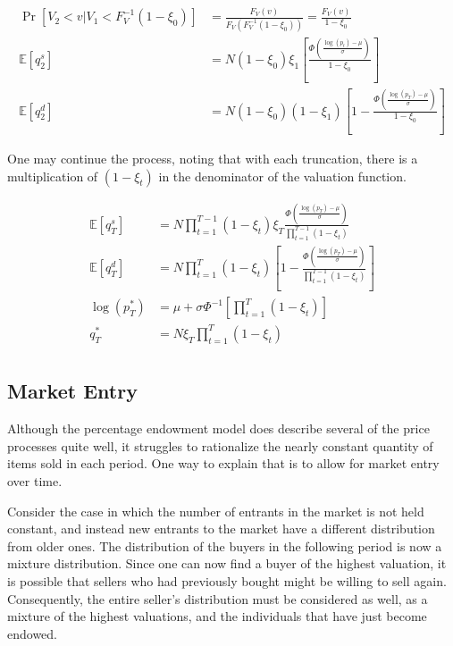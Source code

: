 \documentclass[12pt, letterpaper]{paper}
\begin{document}
\begin{align*}
\Pr \left [ V_2 < v | V_1 < F_V^{-1}( 1 - \xi_0 )^{} \right ] &=
\frac { F_V ( v ) }{  F_V ( F_V^{-1} ( 1 - \xi_0 ) ) } = \frac{ F_V (v)
}{1 - \xi_0}\\
\mathbb{E} \left [ q_2^s \right ] &= N ( 1-\xi_0 )\xi_1 \left [ \frac{\Phi \left ( \frac{ \log ( p_t ) - \mu }{\sigma} \right )}{ 1 - \xi_0 } \right ]\\
\mathbb{E} \left [ q_2^d \right ] &= N ( 1-\xi_0 )(1-\xi_1) \left [ 1 - \frac{ \Phi \left ( \frac{
\log ( p_T ) - \mu }{ \sigma } \right ) }{ 1 - \xi_0 } \right ]
\end{align*}

One may continue the process, noting that with each truncation, there
is a multiplication of $(1-\xi_t)$ in the denominator of the valuation
function.

\begin{align*}
\mathbb{E} \left [ q_T^s \right ] &= N \prod_{t=1}^{T-1} (1-\xi_t ) \xi_T \frac{\Phi \left ( \frac{ \log ( p_T ) - \mu }{\sigma} \right )}{ \prod_{t=1}^{T-1} ( 1 - \xi_t ) }\\
\mathbb{E} \left [ q_T^d \right ] &= N \prod_{t=1}^{T} ( 1- \xi_t ) \left [ 1 - \frac{ \Phi \left ( \frac{
\log ( p_T ) - \mu }{ \sigma } \right ) }{ \prod_{t=1}^{T-1} (1 - \xi_t ) } \right ]\\
\log \left ( p_T^* \right ) &= \mu + \sigma \Phi^{-1} \left [ \prod_{t=1}^T ( 1 - \xi_t ) \right ]\\
q_T^* &= N \xi_T \prod_{t=1}^T ( 1 - \xi_t )\\
\end{align*}



\subsection{Market Entry}
\label{sec-2-3}

Although the percentage endowment model does describe several of the price
processes quite well, it struggles to rationalize the nearly constant
quantity of items sold in each period. One way to explain that is to
allow for market entry over time.

Consider the case in which the number of entrants in the market is not
held constant, and instead new entrants to the market have a different
distribution from older ones. The distribution of the buyers in the
following period is now a mixture distribution. Since one can now
find a buyer of the highest valuation, it is possible that sellers who
had previously bought might be willing to sell again. Consequently, the
entire seller's distribution must be considered as well, as a mixture
of the highest valuations, and the individuals that have just become
endowed.
\end{document}
